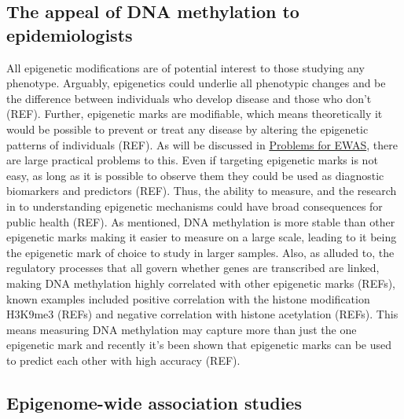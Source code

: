 \documentclass[11pt,twoside]{bristolthesis}
\begin{document}
\hypertarget{appeal-of-dnam}{%
\subsection{The appeal of DNA methylation to epidemiologists}\label{appeal-of-dnam}}

All epigenetic modifications are of potential interest to those studying any phenotype. Arguably, epigenetics could underlie all phenotypic changes and be the difference between individuals who develop disease and those who don't (REF). Further, epigenetic marks are modifiable, which means theoretically it would be possible to prevent or treat any disease by altering the epigenetic patterns of individuals (REF). As will be discussed in \protect\hyperlink{problems-for-ewas}{Problems for EWAS}, there are large practical problems to this. Even if targeting epigenetic marks is not easy, as long as it is possible to observe them they could be used as diagnostic biomarkers and predictors (REF). Thus, the ability to measure, and the research in to understanding epigenetic mechanisms could have broad consequences for public health (REF). As mentioned, DNA methylation is more stable than other epigenetic marks making it easier to measure on a large scale, leading to it being the epigenetic mark of choice to study in larger samples. Also, as alluded to, the regulatory processes that all govern whether genes are transcribed are linked, making DNA methylation highly correlated with other epigenetic marks (REFs), known examples included positive correlation with the histone modification H3K9me3 (REFs) and negative correlation with histone acetylation (REFs). This means measuring DNA methylation may capture more than just the one epigenetic mark and recently it's been shown that epigenetic marks can be used to predict each other with high accuracy (REF).

\hypertarget{ewas}{%
\subsection{Epigenome-wide association studies}\label{ewas}}
\end{document}
